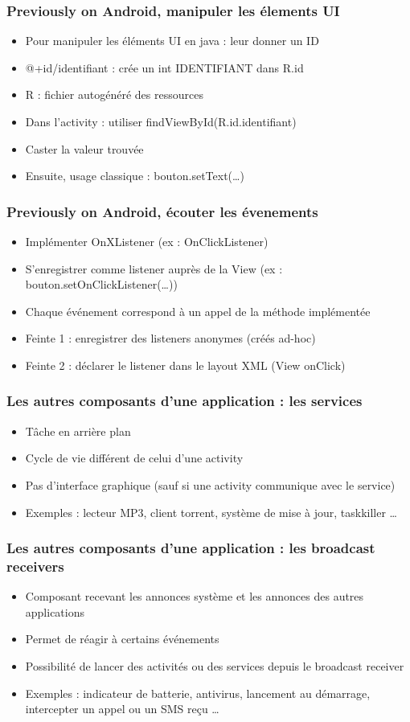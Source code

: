 \documentclass{beamer}
\begin{document}
\begin{frame}[fragile] 
\frametitle{Previously on Android, manipuler les élements UI}
\begin{itemize}
  \item Pour manipuler les éléments UI en java : leur donner un ID
  \item @+id/identifiant : crée un int IDENTIFIANT dans R.id
  \item R : fichier autogénéré des ressources
  \item Dans l'activity : utiliser findViewById(R.id.identifiant)
  \item Caster la valeur trouvée
  \item Ensuite, usage classique : bouton.setText(\ldots)
\end{itemize}
\end{frame}
\begin{frame}[fragile] 
\frametitle{Previously on Android, écouter les évenements}
\begin{itemize}
  \item Implémenter OnXListener (ex : OnClickListener)
  \item S'enregistrer comme listener auprès de la View
  (ex : bouton.setOnClickListener(\ldots))
  \item Chaque événement correspond à un appel de la méthode implémentée
  \item Feinte 1 : enregistrer des listeners anonymes (créés ad-hoc)
  \item Feinte 2 : déclarer le listener dans le layout XML (View onClick)
  
\end{itemize}
\end{frame}
\begin{frame}[fragile]
\frametitle{Les autres composants d'une application : les services}
\begin{itemize}
 \item Tâche en arrière plan
 \item Cycle de vie différent de celui d'une activity
 \item Pas d'interface graphique (sauf si une activity communique avec le
 service)
 \item Exemples : lecteur MP3, client torrent, système de mise à jour, taskkiller \ldots
 \end{itemize}
\end{frame}
\begin{frame}[fragile]
\frametitle{Les autres composants d'une application : les broadcast receivers}
\begin{itemize}
 \item Composant recevant les annonces système et les annonces des autres applications
 \item Permet de réagir à certains événements
 \item Possibilité de lancer des activités ou des services depuis le broadcast receiver
 \item Exemples : indicateur de batterie, antivirus, lancement au démarrage,
 intercepter un appel ou un SMS reçu \ldots
 \end{itemize}
\end{frame}
\end{document}
